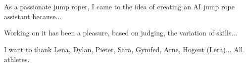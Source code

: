 
\chapter*{}%
\label{ch:voorwoord}


As a passionate jump roper, I came to the idea of creating an AI jump rope assistant because...

Working on it has been a pleasure, based on judging, the variation of skills...

I want to thank Lena, Dylan, Pieter, Sara, Gymfed, Arne, Hogent (Lera)...
All athletes.

\medspace

\lipsum[1-2]